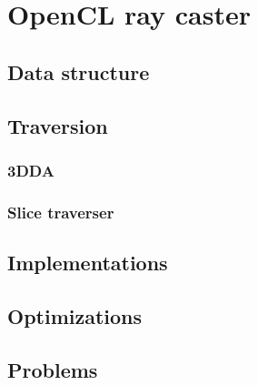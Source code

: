 \section{OpenCL ray caster}

\subsection{Data structure}

\subsection{Traversion}

\subsubsection{3DDA}

\subsubsection{Slice traverser}

\subsection{Implementations}

\subsection{Optimizations}

\subsection{Problems}

